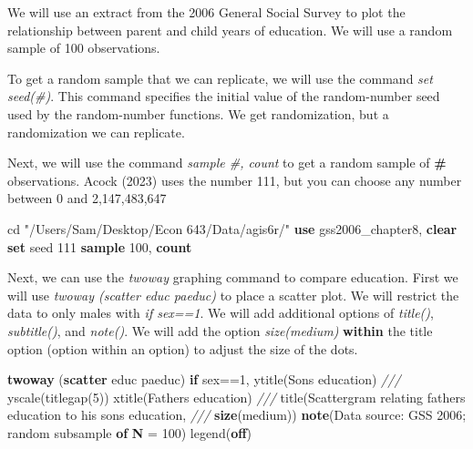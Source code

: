 \documentclass[
]{book}
\newenvironment{Shaded}{\begin{snugshade}}{\end{snugshade}}
\newcommand{\BaseNTok}[1]{\textcolor[rgb]{0.00,0.00,0.81}{#1}}
\newcommand{\CommentTok}[1]{\textcolor[rgb]{0.56,0.35,0.01}{\textit{#1}}}
\newcommand{\DecValTok}[1]{\textcolor[rgb]{0.00,0.00,0.81}{#1}}
\newcommand{\FunctionTok}[1]{\textcolor[rgb]{0.13,0.29,0.53}{\textbf{#1}}}
\newcommand{\KeywordTok}[1]{\textcolor[rgb]{0.13,0.29,0.53}{\textbf{#1}}}
\newcommand{\NormalTok}[1]{#1}
\newcommand{\StringTok}[1]{\textcolor[rgb]{0.31,0.60,0.02}{#1}}
\begin{document}
We will use an extract from the 2006 General Social Survey to plot the relationship between parent and child years of education. We will use a random sample of 100 observations.

To get a random sample that we can replicate, we will use the command \emph{set seed(\#)}. This command specifies the initial value of the random-number seed used by the random-number functions. We get randomization, but a randomization we can replicate.

Next, we will use the command \emph{sample \#, count} to get a random sample of \textbf{\#} observations. Acock (2023) uses the number 111, but you can choose any number between 0 and 2,147,483,647

\begin{Shaded}
\begin{Highlighting}[]
\NormalTok{cd }\StringTok{"/Users/Sam/Desktop/Econ 643/Data/agis6r/"}
\KeywordTok{use}\NormalTok{ gss2006\_chapter8, }\KeywordTok{clear}
\KeywordTok{set} \DecValTok{seed}\NormalTok{ 111}
\KeywordTok{sample}\NormalTok{ 100, }\FunctionTok{count}
\end{Highlighting}
\end{Shaded}

Next, we can use the \emph{twoway} graphing command to compare education. First we will use \emph{twoway (scatter educ paeduc)} to place a scatter plot. We will restrict the data to only males with \emph{if sex==1}. We will add additional options of \emph{title()}, \emph{subtitle()}, and \emph{note()}. We will add the option \emph{size(medium)} \textbf{within} the title option (option within an option) to adjust the size of the dots.

\begin{Shaded}
\begin{Highlighting}[]
\KeywordTok{twoway}\NormalTok{ (}\KeywordTok{scatter}\NormalTok{ educ paeduc) }\KeywordTok{if}\NormalTok{ sex==1, }\BaseNTok{ytitle}\NormalTok{(Son\textquotesingle{}s education) }\CommentTok{///}
  \BaseNTok{yscale}\NormalTok{(titlegap(5)) }\BaseNTok{xtitle}\NormalTok{(Father\textquotesingle{}s education) }\CommentTok{///}
  \BaseNTok{title}\NormalTok{(Scattergram relating father\textquotesingle{}s education to his son\textquotesingle{}s education, }\CommentTok{///}
  \KeywordTok{size}\NormalTok{(medium)) }\KeywordTok{note}\NormalTok{(Data source: GSS 2006; random subsample }\KeywordTok{of} \KeywordTok{N}\NormalTok{ = 100) }\BaseNTok{legend}\NormalTok{(}\KeywordTok{off}\NormalTok{)}
\end{Highlighting}
\end{Shaded}
\end{document}
